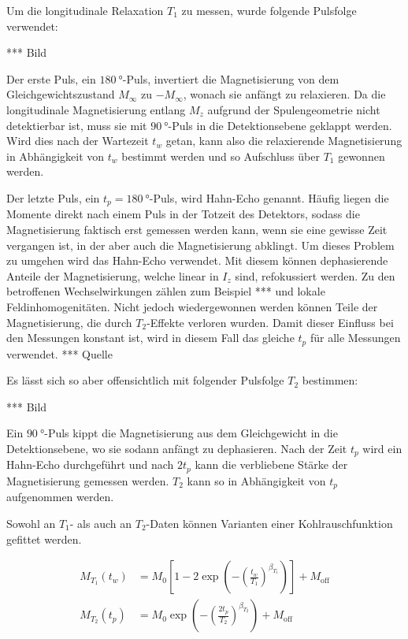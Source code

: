 Um die longitudinale Relaxation $T_1$ zu messen, wurde folgende Pulsfolge verwendet:

*** Bild

Der erste Puls, ein $\SI{180}{\degree}$-Puls, invertiert die Magnetisierung von dem Gleichgewichtszustand $M_\infty$ zu $-M_\infty$, wonach sie anfängt zu relaxieren. Da die longitudinale Magnetisierung entlang $M_z$ aufgrund der Spulengeometrie nicht detektierbar ist, muss sie mit $\SI{90}{\degree}$-Puls in die Detektionsebene geklappt werden. Wird dies nach der Wartezeit $t_w$ getan, kann also die relaxierende Magnetisierung in Abhängigkeit von $t_w$ bestimmt werden und so Aufschluss über $T_1$ gewonnen werden.

Der letzte Puls, ein $t_p = \SI{180}{\degree}$-Puls, wird Hahn-Echo genannt. Häufig liegen die Momente direkt nach einem Puls in der Totzeit des Detektors, sodass die Magnetisierung faktisch erst gemessen werden kann, wenn sie eine gewisse Zeit vergangen ist, in der aber auch die Magnetisierung abklingt. Um dieses Problem zu umgehen wird das Hahn-Echo verwendet. Mit diesem können dephasierende Anteile der Magnetisierung, welche linear in $I_z$ sind, refokussiert werden. Zu den betroffenen Wechselwirkungen zählen zum Beispiel *** und lokale Feldinhomogenitäten. Nicht jedoch wiedergewonnen werden können Teile der Magnetisierung, die durch $T_2$-Effekte verloren wurden. Damit dieser Einfluss bei den Messungen konstant ist, wird in diesem Fall das gleiche $t_p$ für alle Messungen verwendet. *** Quelle

Es lässt sich so aber offensichtlich mit folgender Pulsfolge $T_2$ bestimmen:

*** Bild

Ein $\SI{90}{\degree}$-Puls kippt die Magnetisierung aus dem Gleichgewicht in die Detektionsebene, wo sie sodann anfängt zu dephasieren. Nach der Zeit $t_p$ wird ein Hahn-Echo durchgeführt und nach $2 t_p$ kann die verbliebene Stärke der Magnetisierung gemessen werden. $T_2$ kann so in Abhängigkeit von $t_p$ aufgenommen werden.

Sowohl an $T_1$- als auch an $T_2$-Daten können Varianten einer Kohlrauschfunktion gefittet werden.

\begin{align}
	M_{T_1} (t_w) &= M_0 \left[ 1 - 2 \exp{ \left(- { \left( \frac{t_w}{T_1} \right) }^{\beta_{T_1}} \right)} \right] + M_\text{off} \label{eqn:theo:T_1_fit} \\
    M_{T_2} (t_p) &= M_0 \exp{ \left(- { \left( \frac{2 t_p}{T_2} \right) }^{\beta_{T_2}} \right)} + M_\text{off} \label{eqn:theo:T_2_fit}
\end{align}

